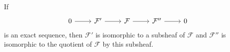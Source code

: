 If
\[\begin{tikzcd}
	0 \arrow[r] & \mathcal{F}' \arrow[r] & \mathcal{F}  \arrow[r] & \mathcal{F}'' \arrow[r] & 0
\end{tikzcd}\]
is an exact sequence, then $\mathcal{F}'$ is isomorphic to a subsheaf of $\mathcal{F}$ and
$\mathcal{F}''$ is isomorphic to the quotient of $\mathcal{F}$ by this subsheaf.
